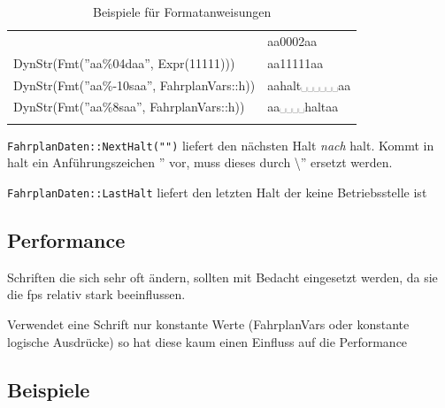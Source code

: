 \begin{longtable}[c]{@{}ll@{}}
\begin{minipage}[t]{0.67\columnwidth}
\end{minipage} & \begin{minipage}[t]{0.33\columnwidth}\raggedright
aa0002aa
\end{minipage}
\\\noalign{\medskip}
\begin{minipage}[t]{0.67\columnwidth}\raggedright
DynStr(Fmt(''aa\%04daa'', Expr(11111)))
\end{minipage} & \begin{minipage}[t]{0.33\columnwidth}\raggedright
aa11111aa
\end{minipage}
\\\noalign{\medskip}
\begin{minipage}[t]{0.67\columnwidth}\raggedright
DynStr(Fmt(''aa\%-10saa'', FahrplanVars::h))
\end{minipage} & \begin{minipage}[t]{0.33\columnwidth}\raggedright
aahalt␣␣␣␣␣␣aa
\end{minipage}
\\\noalign{\medskip}
\begin{minipage}[t]{0.67\columnwidth}\raggedright
DynStr(Fmt(''aa\%8saa'', FahrplanVars::h))
\end{minipage} & \begin{minipage}[t]{0.33\columnwidth}\raggedright
aa␣␣␣␣haltaa
\end{minipage}
\\\noalign{\medskip}
\hline
\noalign{\medskip}
\caption{Beispiele für Formatanweisungen}
\end{longtable}

\texttt{FahrplanDaten::NextHalt("")} liefert den nächsten Halt
\emph{nach} halt. Kommt in halt ein Anführungszeichen '' vor, muss dieses durch \textbackslash{}'' ersetzt werden.

\texttt{FahrplanDaten::LastHalt} liefert den letzten Halt der keine Betriebsstelle ist

\subsection{Performance}

Schriften die sich sehr oft ändern, sollten mit Bedacht eingesetzt
werden, da sie die fps relativ stark beeinflussen.

Verwendet eine Schrift nur konstante Werte (FahrplanVars oder konstante
logische Ausdrücke) so hat diese kaum einen Einfluss auf die Performance

\subsection{Beispiele}


